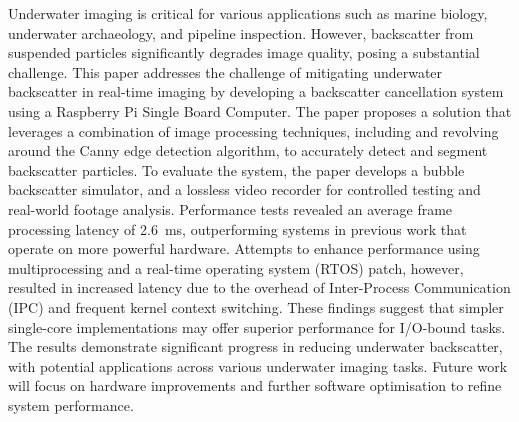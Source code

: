 Underwater imaging is critical for various applications such as marine biology, underwater archaeology, and pipeline inspection. However, backscatter from suspended particles significantly degrades image quality, posing a substantial challenge. This paper addresses the challenge of mitigating underwater backscatter in real-time imaging by developing a backscatter cancellation system using a Raspberry Pi Single Board Computer. The paper proposes a solution that leverages a combination of image processing techniques, including and revolving around the Canny edge detection algorithm, to accurately detect and segment backscatter particles. To evaluate the system, the paper develops a bubble backscatter simulator, and a lossless video recorder for controlled testing and real-world footage analysis. Performance tests revealed an average frame processing latency of \SI{2.6}{\milli\second}, outperforming systems in previous work that operate on more powerful hardware. Attempts to enhance performance using multiprocessing and a real-time operating system (RTOS) patch, however, resulted in increased latency due to the overhead of Inter-Process Communication (IPC) and frequent kernel context switching. These findings suggest that simpler single-core implementations may offer superior performance for I/O-bound tasks. The results demonstrate significant progress in reducing underwater backscatter, with potential applications across various underwater imaging tasks. Future work will focus on hardware improvements and further software optimisation to refine system performance.
